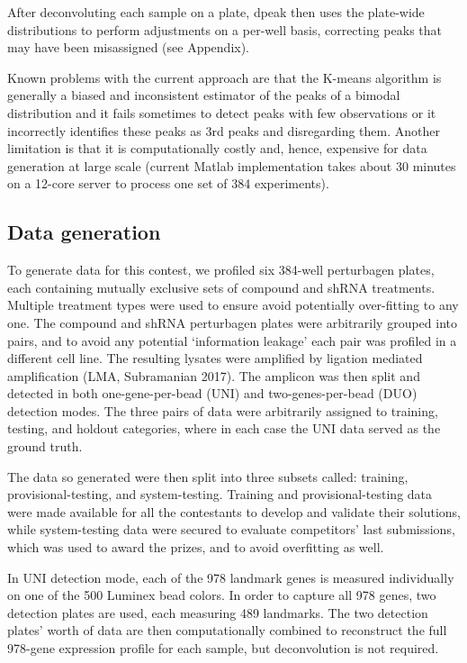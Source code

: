 \documentclass[]{article}
\begin{document}
After deconvoluting each sample on a plate, dpeak then uses the
plate-wide distributions to perform adjustments on a per-well basis,
correcting peaks that may have been misassigned (see Appendix).

Known problems with the current approach are that the K-means algorithm
is generally a biased and inconsistent estimator of the peaks of a
bimodal distribution and it fails sometimes to detect peaks with few
observations or it incorrectly identifies these peaks as 3rd peaks and
disregarding them. Another limitation is that it is computationally
costly and, hence, expensive for data generation at large scale (current
Matlab implementation takes about 30 minutes on a 12-core server to
process one set of 384 experiments).

\hypertarget{data-generation-1}{%
\subsection{Data generation}\label{data-generation-1}}

To generate data for this contest, we profiled six 384-well perturbagen
plates, each containing mutually exclusive sets of compound and shRNA
treatments. Multiple treatment types were used to ensure avoid
potentially over-fitting to any one. The compound and shRNA perturbagen
plates were arbitrarily grouped into pairs, and to avoid any potential
`information leakage' each pair was profiled in a different cell line.
The resulting lysates were amplified by ligation mediated amplification
(LMA, Subramanian 2017). The amplicon was then split and detected in
both one-gene-per-bead (UNI) and two-genes-per-bead (DUO) detection
modes. The three pairs of data were arbitrarily assigned to training,
testing, and holdout categories, where in each case the UNI data served
as the ground truth.

The data so generated were then split into three subsets called:
training, provisional-testing, and system-testing. Training and
provisional-testing data were made available for all the contestants to
develop and validate their solutions, while system-testing data were
secured to evaluate competitors' last submissions, which was used to
award the prizes, and to avoid overfitting as well.

In UNI detection mode, each of the 978 landmark genes is measured
individually on one of the 500 Luminex bead colors. In order to capture
all 978 genes, two detection plates are used, each measuring 489
landmarks. The two detection plates' worth of data are then
computationally combined to reconstruct the full 978-gene expression
profile for each sample, but deconvolution is not required.
\end{document}
